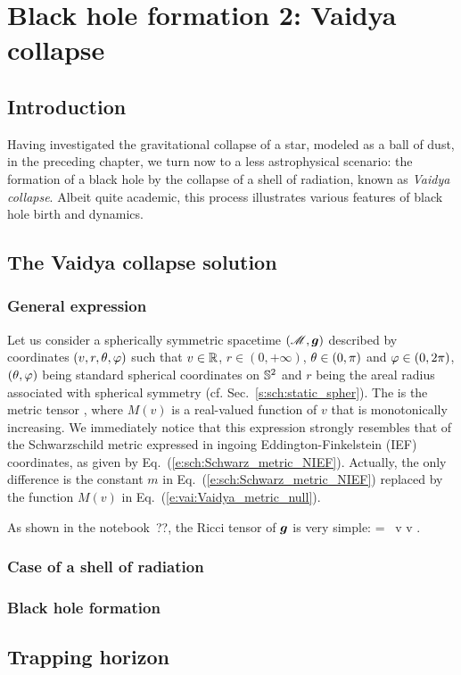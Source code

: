 \chapter{Black hole formation 2: Vaidya collapse}
\label{s:vai}

\minitoc

\section{Introduction}

Having investigated the gravitational collapse of a star, modeled as a ball of dust,
in the preceding chapter, we turn now to a less astrophysical scenario: the
formation of a black hole by the collapse of a shell of radiation,
known as \emph{Vaidya collapse}. Albeit quite
academic, this process illustrates various features of black hole birth and dynamics.

\section{The Vaidya collapse solution}

\subsection{General expression}

Let us consider a spherically symmetric spacetime $(\mathscr{M},\bm{g})$ described by
coordinates $(v,r,\theta,\varphi)$ such that $v\in \mathbb{R}$, $r\in(0, +\infty)$,
$\theta\in(0,\pi)$ and $\varphi\in(0,2\pi)$, $(\theta,\varphi)$ being standard
spherical coordinates on $\mathbb{S}^2$ and $r$ being the areal radius associated
with spherical symmetry (cf. Sec.~\ref{s:sch:static_spher}).
The  is the metric tensor
\be \label{e:vai:Vaidya_metric_null}
     ,
\ee
where $M(v)$ is a real-valued function of $v$ that is monotonically increasing.
We immediately notice that this expression strongly resembles that
of the Schwarzschild metric expressed in ingoing Eddington-Finkelstein (IEF)
coordinates, as given by Eq.~(\ref{e:sch:Schwarz_metric_NIEF}). Actually, the
only difference is the constant $m$ in Eq.~(\ref{e:sch:Schwarz_metric_NIEF})
replaced by the function $M(v)$ in Eq.~(\ref{e:vai:Vaidya_metric_null}).

As shown in the notebook~??, the Ricci tensor of $\bm{g}$ is very simple:
\be
     = \, \dd v \otimes \dd v .
\ee

\subsection{Case of a shell of radiation}

\subsection{Black hole formation}

\section{Trapping horizon}
